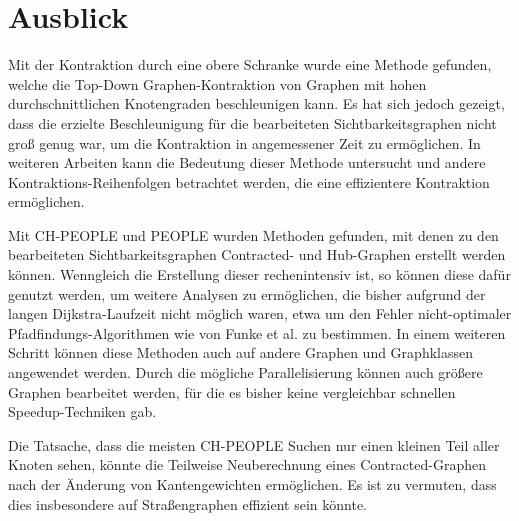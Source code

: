 \chapter{Ausblick}

Mit der Kontraktion durch eine obere Schranke wurde eine Methode gefunden, welche die Top-Down Graphen-Kontraktion von Graphen mit hohen durchschnittlichen Knotengraden beschleunigen kann.
Es hat sich jedoch gezeigt, dass die erzielte Beschleunigung für die bearbeiteten Sichtbarkeitsgraphen nicht groß genug war, um die Kontraktion in angemessener Zeit zu ermöglichen.
In weiteren Arbeiten kann die Bedeutung dieser Methode untersucht und andere Kontraktions-Reihenfolgen betrachtet werden, die eine effizientere Kontraktion ermöglichen.

Mit CH-PEOPLE und PEOPLE wurden Methoden gefunden, mit denen zu den bearbeiteten Sichtbarkeitsgraphen Contracted- und Hub-Graphen erstellt werden können.
Wenngleich die Erstellung dieser rechenintensiv ist, so können diese dafür genutzt werden, um weitere Analysen zu ermöglichen, die bisher aufgrund der langen Dijkstra-Laufzeit nicht möglich waren, etwa um den Fehler nicht-optimaler Pfadfindungs-Algorithmen wie von Funke et al. \cite{funkescalable} zu bestimmen.
In einem weiteren Schritt können diese Methoden auch auf andere Graphen und Graphklassen angewendet werden.
Durch die mögliche Parallelisierung können auch größere Graphen bearbeitet werden, für die es bisher keine vergleichbar schnellen Speedup-Techniken gab.

Die Tatsache, dass die meisten CH-PEOPLE Suchen nur einen kleinen Teil aller Knoten sehen, könnte die Teilweise Neuberechnung eines Contracted-Graphen nach der Änderung von Kantengewichten ermöglichen.
Es ist zu vermuten, dass dies insbesondere auf Straßengraphen effizient sein könnte.